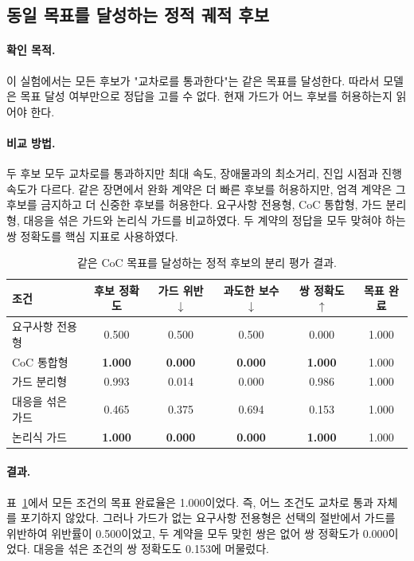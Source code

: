 \subsection{동일 목표를 달성하는 정적 궤적 후보}

\paragraph{확인 목적.}
이 실험에서는 모든 후보가 "교차로를 통과한다"는 같은 목표를 달성한다. 따라서 모델은 목표 달성 여부만으로 정답을 고를 수 없다. 현재 가드가 어느 후보를 허용하는지 읽어야 한다.

\paragraph{비교 방법.}
두 후보 모두 교차로를 통과하지만 최대 속도, 장애물과의 최소거리, 진입 시점과 진행 속도가 다르다. 같은 장면에서 완화 계약은 더 빠른 후보를 허용하지만, 엄격 계약은 그 후보를 금지하고 더 신중한 후보를 허용한다. 요구사항 전용형, CoC 통합형, 가드 분리형, 대응을 섞은 가드와 논리식 가드를 비교하였다. 두 계약의 정답을 모두 맞혀야 하는 쌍 정확도를 핵심 지표로 사용하였다.

\begin{table}[!t]
\centering
\caption{같은 CoC 목표를 달성하는 정적 후보의 분리 평가 결과.}
\label{tab:static}
\footnotesize
\begin{tabular}{lccccc}
\toprule
조건 & 후보 정확도 & 가드 위반 $\downarrow$ & 과도한 보수 $\downarrow$ & 쌍 정확도 $\uparrow$ & 목표 완료 \\
\midrule
요구사항 전용형 & 0.500 & 0.500 & 0.500 & 0.000 & 1.000 \\
CoC 통합형 & \textbf{1.000} & \textbf{0.000} & \textbf{0.000} & \textbf{1.000} & 1.000 \\
가드 분리형 & 0.993 & 0.014 & 0.000 & 0.986 & 1.000 \\
대응을 섞은 가드 & 0.465 & 0.375 & 0.694 & 0.153 & 1.000 \\
논리식 가드 & \textbf{1.000} & \textbf{0.000} & \textbf{0.000} & \textbf{1.000} & 1.000 \\
\bottomrule
\end{tabular}
\end{table}

\paragraph{결과.}
표~\ref{tab:static}에서 모든 조건의 목표 완료율은 1.000이었다. 즉, 어느 조건도 교차로 통과 자체를 포기하지 않았다. 그러나 가드가 없는 요구사항 전용형은 선택의 절반에서 가드를 위반하여 위반률이 0.500이었고, 두 계약을 모두 맞힌 쌍은 없어 쌍 정확도가 0.000이었다. 대응을 섞은 조건의 쌍 정확도도 0.153에 머물렀다.

